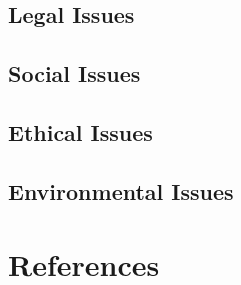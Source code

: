\documentclass{article}
\begin{document}
\subsection{Legal Issues}

\subsection{Social Issues}

\subsection{Ethical Issues}

\subsection{Environmental Issues}

\section{References}
\end{document}
